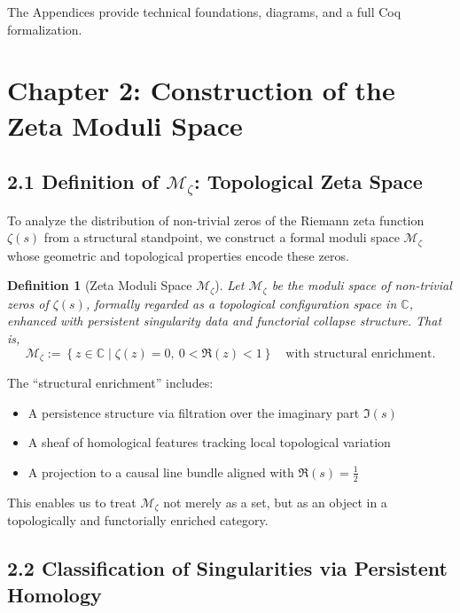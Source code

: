 \documentclass[11pt]{article}
\newtheorem{definition}[theorem]{Definition}
\begin{document}
The Appendices provide technical foundations, diagrams, and a full Coq formalization.



\section{Chapter 2: Construction of the Zeta Moduli Space}

\subsection{2.1 Definition of $\mathcal{M}_\zeta$: Topological Zeta Space}

To analyze the distribution of non-trivial zeros of the Riemann zeta function $\zeta(s)$ from a structural standpoint,  
we construct a formal moduli space $\mathcal{M}_\zeta$ whose geometric and topological properties encode these zeros.

\begin{definition}[Zeta Moduli Space $\mathcal{M}_\zeta$]
Let $\mathcal{M}_\zeta$ be the moduli space of non-trivial zeros of $\zeta(s)$, formally regarded as a topological configuration space in $\mathbb{C}$,  
enhanced with persistent singularity data and functorial collapse structure. That is,
\[
\mathcal{M}_\zeta := \left\{ z \in \mathbb{C} \mid \zeta(z) = 0,\ 0 < \Re(z) < 1 \right\} \quad \text{with structural enrichment}.
\]
\end{definition}

The ``structural enrichment'' includes:

\begin{itemize}
    \item A persistence structure via filtration over the imaginary part $\Im(s)$
    \item A sheaf of homological features tracking local topological variation
    \item A projection to a causal line bundle aligned with $\Re(s) = \tfrac{1}{2}$
\end{itemize}

This enables us to treat $\mathcal{M}_\zeta$ not merely as a set, but as an object in a topologically and functorially enriched category.

\subsection{2.2 Classification of Singularities via Persistent Homology}
\end{document}
